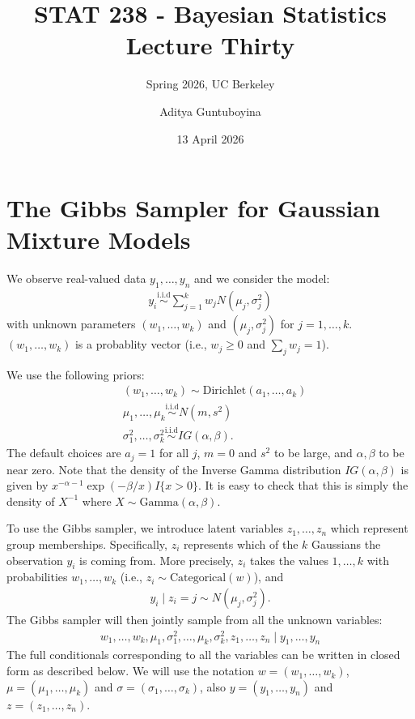 \documentclass{scrartcl}
\begin{document}
\title{STAT 238 - Bayesian Statistics  \\
  Lecture Thirty} 
\subtitle{Spring 2026, UC Berkeley}

\author{Aditya Guntuboyina}


\date{13 April 2026}

\maketitle

\section{The Gibbs Sampler for Gaussian Mixture Models}

We observe real-valued data $y_1, \dots, y_n$ and we consider the model:
\begin{align*}
  y_i \overset{\text{i.i.d}}{\sim} \sum_{j=1}^k w_j N(\mu_j, \sigma_j^2)
\end{align*}
with unknown parameters $(w_1, \dots, w_k)$ and $(\mu_j, \sigma_j^2)$
for $j = 1, \dots, k$.  $(w_1, \dots, w_k)$ is a probablity vector
(i.e., $w_j \geq 0$ and $\sum_j w_j = 1$).

We use the following priors:
\begin{align*}
  & (w_1, \dots, w_k) \sim \text{Dirichlet}(a_1, \dots, a_k) \\
  & \mu_1, \dots, \mu_k \overset{\text{i.i.d}}{\sim} N(m, s^2) \\
  & \sigma_1^2, \dots, \sigma_k^2 \overset{\text{i.i.d}}{\sim}
    IG(\alpha, \beta). 
\end{align*}
The default choices are $a_j = 1$ for all $j$, $m = 0$ and $s^2$ to be
large, and $\alpha, \beta$ to be near zero. Note that the density of
the Inverse Gamma distribution $IG(\alpha, \beta)$ is given by
$x^{-\alpha - 1} \exp(-\beta/x) I\{x > 0\}$. It is easy to check that
this is simply the density of $X^{-1}$ where $X \sim
\text{Gamma}(\alpha, \beta)$.  

To use the Gibbs sampler, we introduce latent variables $z_1, \dots,
z_n$ 
which represent group memberships. Specifically, $z_i$ represents
which of the $k$ Gaussians the observation $y_i$ is coming from. More
precisely, $z_i$ takes the values $1, \dots, k$ with probabilities
$w_1, \dots, w_k$ (i.e., $z_i \sim \text{Categorical}(w)$), and 
\begin{align*}
  y_i \mid z_i = j \sim N(\mu_j, \sigma_j^2). 
\end{align*}
The Gibbs sampler will then jointly sample from all the unknown
variables:
\begin{align*}
  w_1, \dots, w_k, \mu_1, \sigma_1^2, \dots, \mu_k, \sigma_k^2, z_1,
  \dots, z_n \mid y_1, \dots, y_n
\end{align*}
The full conditionals corresponding to all the variables can be
written in closed form as described below. We will use the notation $w
= (w_1, \dots, w_k)$, $\mu = (\mu_1, \dots, \mu_k)$ and $\sigma =
(\sigma_1, \dots, \sigma_k)$, also $y = (y_1, \dots, y_n)$ and $z =
(z_1, \dots, z_n)$. 
\end{document}

